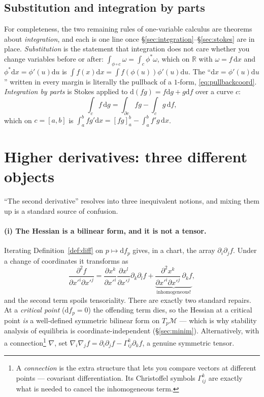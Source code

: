 \documentclass[10pt,a4paper]{article}
\newcommand{\dd}{\mathrm{d}}
\newcommand{\R}{\mathbb{R}}
\newcommand{\M}{\mathcal{M}}
\newcommand{\pd}[2]{\frac{\partial #1}{\partial #2}}
\theoremstyle{plain}
\theoremstyle{definition}
\numberwithin{equation}{section}
\begin{document}
\subsection{Substitution and integration by parts}

For completeness, the two remaining rules of one-variable calculus are theorems about
\emph{integration}, and each is one line once \S\ref{sec:integration}--\S\ref{sec:stokes} are in
place. \emph{Substitution} is the statement that integration does not care whether you change
variables before or after: $\int_{\phi\circ c}\omega=\int_c\phi^*\omega$, which on $\R$ with
$\omega=f\,\dd x$ and $\phi^*\dd x=\phi'(u)\dd u$ is
$\int f(x)\dd x=\int f(\phi(u))\phi'(u)\dd u$. The ``$\dd x=\phi'(u)\dd u$'' written in every
margin is literally the pullback of a $1$-form, \eqref{eq:pullbackcoord}.
\emph{Integration by parts} is Stokes applied to $\dd(fg)=f\dd g+g\dd f$ over a curve $c$:
\begin{equation}
\int_c f\,\dd g=\int_{\partial c}fg-\int_c g\,\dd f ,
\label{eq:ibp}
\end{equation}
which on $c=[a,b]$ is $\int_a^b fg'\dd x=[fg]_a^b-\int_a^b f'g\,\dd x$.

\section{Higher derivatives: three different objects}
\label{sec:higher}

``The second derivative'' resolves into three inequivalent notions, and mixing them up is a
standard source of confusion.

\paragraph{(i) The Hessian is a bilinear form, and it is not a tensor.} Iterating
Definition~\ref{def:diff} on $p\mapsto\dd f_p$ gives, in a chart, the array
$\partial_i\partial_jf$. Under a change of coordinates it transforms as
\begin{equation}
\pd{^2f}{x'^i\partial x'^j}=\pd{x^k}{x'^i}\pd{x^l}{x'^j}\partial_k\partial_lf
+\underbrace{\pd{^2x^k}{x'^i\partial x'^j}\,\partial_kf}_{\text{inhomogeneous!}} ,
\label{eq:hesstransf}
\end{equation}
and the second term spoils tensoriality. There are exactly two standard repairs. At a
\emph{critical point} ($\dd f_p=0$) the offending term dies, so the Hessian at a critical point
\emph{is} a well-defined symmetric bilinear form on $T_p\M$ --- which is why stability analysis
of equilibria is coordinate-independent (\S\ref{sec:minim}). Alternatively, with a
connection\footnote{A \emph{connection} is the extra structure that lets you compare vectors at
different points --- covariant differentiation. Its Christoffel symbols $\Gamma^k_{ij}$ are
exactly what is needed to cancel the inhomogeneous term.} $\nabla$, set
$\nabla_i\nabla_jf=\partial_i\partial_jf-\Gamma^k_{ij}\partial_kf$, a genuine symmetric tensor.
\end{document}

